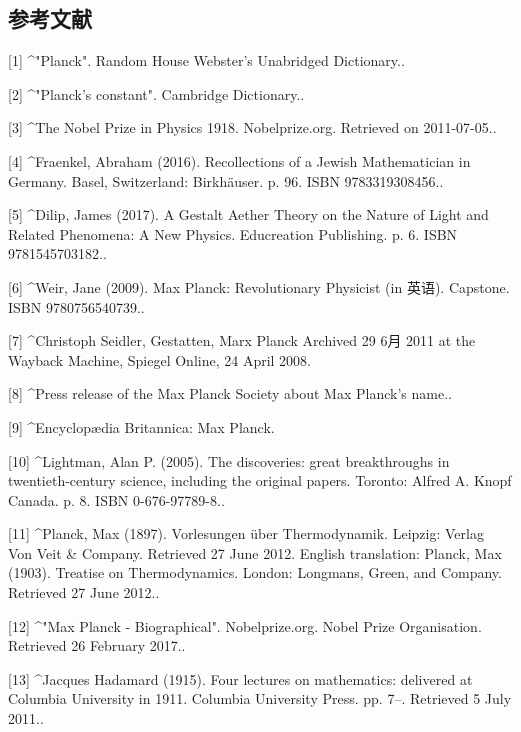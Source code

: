 \subsection{参考文献}
[1]
^"Planck". Random House Webster's Unabridged Dictionary..

[2]
^"Planck's constant". Cambridge Dictionary..

[3]
^The Nobel Prize in Physics 1918. Nobelprize.org. Retrieved on 2011-07-05..

[4]
^Fraenkel, Abraham (2016). Recollections of a Jewish Mathematician in Germany. Basel, Switzerland: Birkhäuser. p. 96. ISBN 9783319308456..

[5]
^Dilip, James (2017). A Gestalt Aether Theory on the Nature of Light and Related Phenomena: A New Physics. Educreation Publishing. p. 6. ISBN 9781545703182..

[6]
^Weir, Jane (2009). Max Planck: Revolutionary Physicist (in 英语). Capstone. ISBN 9780756540739..

[7]
^Christoph Seidler, Gestatten, Marx Planck Archived 29 6月 2011 at the Wayback Machine, Spiegel Online, 24 April 2008.

[8]
^Press release of the Max Planck Society about Max Planck's name..

[9]
^Encyclopædia Britannica: Max Planck.

[10]
^Lightman, Alan P. (2005). The discoveries: great breakthroughs in twentieth-century science, including the original papers. Toronto: Alfred A. Knopf Canada. p. 8. ISBN 0-676-97789-8..

[11]
^Planck, Max (1897). Vorlesungen über Thermodynamik. Leipzig: Verlag Von Veit & Company. Retrieved 27 June 2012. English translation: Planck, Max (1903). Treatise on Thermodynamics. London: Longmans, Green, and Company. Retrieved 27 June 2012..

[12]
^"Max Planck - Biographical". Nobelprize.org. Nobel Prize Organisation. Retrieved 26 February 2017..

[13]
^Jacques Hadamard (1915). Four lectures on mathematics: delivered at Columbia University in 1911. Columbia University Press. pp. 7–. Retrieved 5 July 2011..

